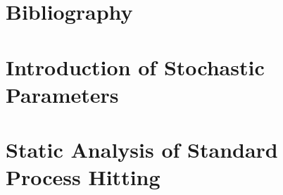 \documentclass[fleqn,8pt,t]{beamer}
\begin{document}
\section[x]{Bibliography}


\section{Introduction of Stochastic Parameters}




\section{Static Analysis of Standard Process Hitting}



\setcounter{framenumber}{\value{finalframe}}
\end{document}
